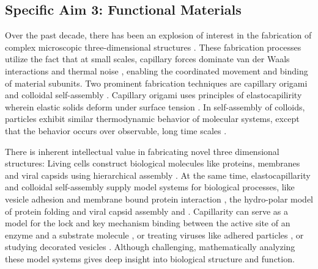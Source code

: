 

\subsection{Specific Aim 3: Functional Materials}
\label{subsec:specific_aim_3}
%
Over the past decade, there has been an explosion of interest in the fabrication of complex microscopic three-dimensional structures 
\cite{Cho2010}. These fabrication processes utilize the fact that at small scales, capillary forces dominate  van der Waals interactions and thermal noise  \cite{Zhang2017}, enabling the coordinated movement and binding of material subunits. Two prominent fabrication techniques are capillary origami 
\cite{Pandey2011,Leong2007,Reynolds2019} and colloidal self-assembly \cite{Dasgupta2017,Siontorou2017}. Capillary origami uses principles of elastocapilirity wherein elastic solids deform under surface tension \cite{Bico2018,VanHonschoten2010}. In self-assembly of colloids, 
particles exhibit similar thermodynamic behavior of molecular systems, except that the behavior occurs over observable, long time scales \cite{Zhang2017}. 

There is inherent intellectual value in fabricating novel three dimensional structures: Living cells construct biological molecules like proteins, membranes and viral capsids using hierarchical assembly \cite{Whitesides2002}. At the same time, elastocapillarity and colloidal self-assembly supply model systems for biological processes, like vesicle adhesion and membrane bound protein interaction \cite{Dasgupta2017}, the hydro-polar model of protein folding \cite{Lau1989,Pandey2011} and viral capsid assembly and \cite{CASPAR1962}. Capillarity can serve as a model for the lock and key mechanism binding between the active site of an enzyme and a substrate molecule \cite{Araujo2018}, or treating viruses like adhered particles 
\cite{Agudo-Canalejo2017,Agudo-Canalejo2015,Deserno2004}, or studying decorated vesicles 
\cite{Auth2009,Weikl2002,Atilgan2007}. Although challenging, mathematically analyzing these model systems gives deep insight into biological structure and function.


